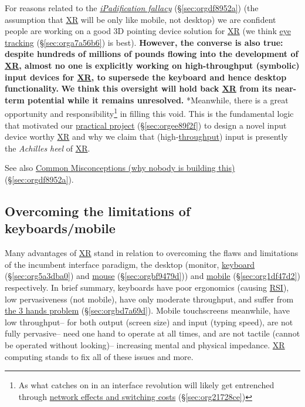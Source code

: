 \documentclass[logo,bsc,singlespacing,parskip]{infthesis}
\begin{document}
For reasons related to the \emph{\hyperref[ipadification fallacy]{iPadification fallacy}} (\S \ref{sec:orgdf8952a}) (the assumption that \hyperref[orgf7f8e78]{XR} will be only like mobile, not desktop) we are confident people are working on a good 3D pointing device solution for \hyperref[orgf7f8e78]{XR} (we think \hyperref[sec:orga7a56b6]{eye tracking} (\S \ref{sec:orga7a56b6}) is best).
\textbf{However, the converse is also true: despite hundreds of millions of pounds flowing into the development of \hyperref[orgf7f8e78]{XR}, almost no one is explicitly working on high-throughput (symbolic) input devices for \hyperref[orgf7f8e78]{XR}, to supersede the keyboard and hence desktop functionality.}
\textbf{We think this oversight will hold back \hyperref[orgf7f8e78]{XR} from its near-term potential while it remains unresolved.}
*Meanwhile, there is a great opportunity and responsibility\footnote{As what catches on in an interface revolution will likely get entrenched through \hyperref[sec:org21728ce]{network effects and switching costs} (\S \ref{sec:org21728ce})} in filling this void.
This is the fundamental logic that motivated our \hyperref[sec:orgee89f2f]{practical project} (\S \ref{sec:orgee89f2f}) to design a novel input device worthy \hyperref[orgf7f8e78]{XR} and why we claim that (high-\hyperref[throughput]{throughput}) input is presently the \emph{Achilles heel} of \hyperref[orgf7f8e78]{XR}.

See also \hyperref[sec:orgdf8952a]{Common Misconceptions (why nobody is building this)} (\S \ref{sec:orgdf8952a}).
\subsection{Overcoming the limitations of keyboards/mobile}
\label{sec:org155f688}
Many advantages of \hyperref[orgf7f8e78]{XR} stand in relation to overcoming the flaws and limitations of the incumbent interface paradigm, the desktop (monitor, \hyperref[sec:org5a3dba0]{keyboard} (\S \ref{sec:org5a3dba0}) and \hyperref[sec:orgbf9479d]{mouse} (\S \ref{sec:orgbf9479d})) and \hyperref[sec:org1df47d2]{mobile} (\S \ref{sec:org1df47d2}) respectively.
In brief summary, keyboards have poor ergonomics (causing \hyperref[orgc186d45]{RSI}), low pervasiveness (not mobile), have only moderate throughput, and suffer from \hyperref[sec:orgbd7a69d]{the 3 hands problem} (\S \ref{sec:orgbd7a69d}).
Mobile touchscreens meanwhile, have low throughput-- for both output (screen size) and input (typing speed), are not fully pervasive-- need one hand to operate at all times, and are not tactile (cannot be operated without looking)-- increasing mental and physical impedance.
\hyperref[orgf7f8e78]{XR} computing stands to fix all of these issues and more.
\end{document}
